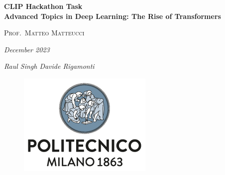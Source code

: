 

\begin{titlepage}
    \centering
    \vspace{1em}
    
    {\Huge\bfseries CLIP Hackathon Task \\ \normalsize\bfseries Advanced Topics in Deep Learning: The Rise of Transformers}
    
    \vspace{4em}
    
    {\large\scshape Prof.~Matteo Matteucci\par} 
    
    \vspace{3em}
    
    {\large\slshape December 2023 \par}
    
    \vspace{3em}
    
    \begin{multicols}{2}
        \large\itshape
        Raul Singh 
        \vfill\null\columnbreak
        Davide Rigamonti
    \end{multicols}
    
    \vfill
    
    \begin{figure}[b]
        \includegraphics[scale=0.6]{img/polimi.png} 
        \centering
    \end{figure}
\end{titlepage}
